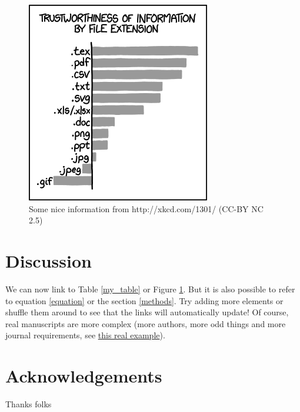 \documentclass[12pt,letterpaper]{article}
\begin{document}
\begin{figure}[!htpb]
\centering
    \includegraphics{file_extension_xkcd_1301.png} %
\caption{Some nice information from http://xkcd.com/1301/ (CC-BY NC 2.5)} %
\label{my_figure}
\end{figure}

\newpage %

\section{Discussion}
We can now link to Table \ref{my_table} or Figure \ref{my_figure}.
But it is also possible to refer to equation \ref{equation} or the section \ref{methods}.
Try adding more elements or shuffle them around to see that the links will automatically update!
Of course, real manuscripts are more complex (more authors, more odd things and more journal requirements, see \href{https://github.com/TGuillerme/Total_Evidence_Method-Missing_data/blob/master/Manuscript/TEM_revised_manuscrip_highlithed.tex}{this real example}). 

\section{Acknowledgements}
Thanks folks






\end{document}
